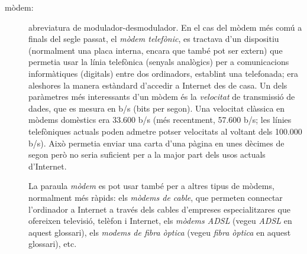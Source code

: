 \begin{description}
\item[mòdem:] abreviatura de modulador-desmodulador. En el cas del
  mòdem més comú a finals del segle passat, el \emph{mòdem telefònic},
  es tractava d'un dispositiu (normalment una placa interna, encara
  que també pot ser extern) que permetia usar la línia telefònica
  (senyals analògics) per a comunicacions informàtiques (digitals)
  entre dos ordinadors, establint una telefonada; era aleshores la
  manera estàndard d'accedir a Internet des de casa. Un dels
  paràmetres més interessants d'un mòdem és la
  \emph{velocitat} de transmissió de dades, que es mesura en b/s (bits
  per segon). Una velocitat clàssica en mòdems domèstics era 33.600
  b/s (més recentment, 57.600 b/s; les línies telefòniques actuals
  poden admetre potser velocitats al voltant dels 100.000 b/s).  Això
  permetia enviar una carta d'una pàgina en unes dècimes de segon però
  no seria suficient per a la major part dels usos actuals d'Internet.

  La paraula \emph{mòdem} es pot usar també per a altres tipus de
  mòdems, normalment més ràpids: els \emph{mòdems de cable}, que
  permeten connectar l'ordinador a Internet a través dels cables
  d'empreses especialitzares que ofereixen televisió, telèfon i
  Internet, els \emph{mòdems ADSL} (vegeu \emph{ADSL} en aquest
  glossari), els \emph{modems de fibra òptica} (vegeu \emph{fibra
    òptica} en aquest glossari), etc.



\end{description}
